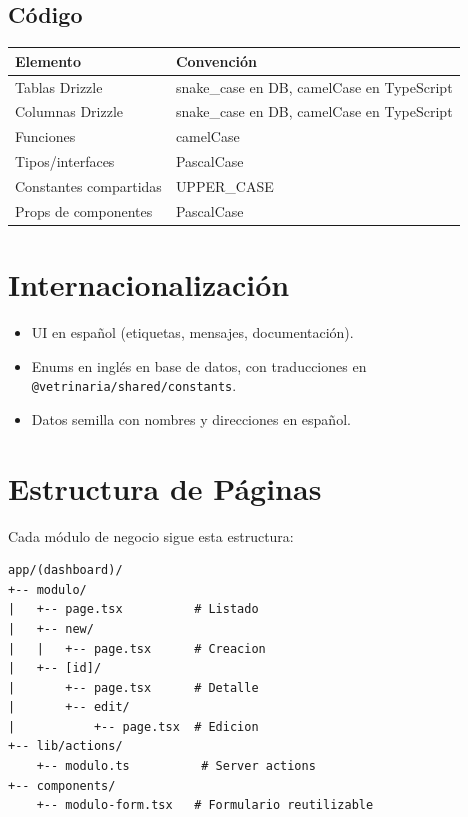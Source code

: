\subsection{C\'odigo}

\begin{longtable}{|l|l|}
\hline
\textbf{Elemento} & \textbf{Convenci\'on} \\
\hline
Tablas Drizzle & snake\_case en DB, camelCase en TypeScript \\
Columnas Drizzle & snake\_case en DB, camelCase en TypeScript \\
Funciones & camelCase \\
Tipos/interfaces & PascalCase \\
Constantes compartidas & UPPER\_CASE \\
Props de componentes & PascalCase \\
\hline
\end{longtable}

\section{Internacionalizaci\'on}

\begin{itemize}[leftmargin=*]
    \item UI en espa\~nol (etiquetas, mensajes, documentaci\'on).
    \item Enums en ingl\'es en base de datos, con traducciones en
          \texttt{@vetrinaria/shared/constants}.
    \item Datos semilla con nombres y direcciones en espa\~nol.
\end{itemize}

\section{Estructura de P\'aginas}

Cada m\'odulo de negocio sigue esta estructura:

\begin{lstlisting}[style=bash, caption=Estructura tipica de modulo de negocio]
app/(dashboard)/
+-- modulo/
|   +-- page.tsx          # Listado
|   +-- new/
|   |   +-- page.tsx      # Creacion
|   +-- [id]/
|       +-- page.tsx      # Detalle
|       +-- edit/
|           +-- page.tsx  # Edicion
+-- lib/actions/
    +-- modulo.ts          # Server actions
+-- components/
    +-- modulo-form.tsx   # Formulario reutilizable
\end{lstlisting}

